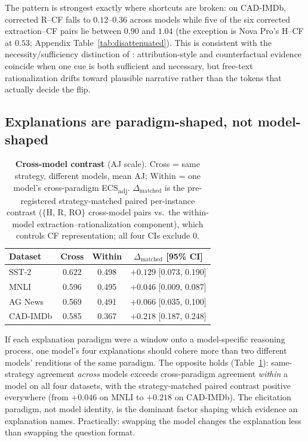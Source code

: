\documentclass[11pt]{article}
\newcommand{\ecsadj}{\mbox{ECS\textsubscript{adj}}}
\begin{document}
The pattern is strongest exactly where shortcuts are broken: on CAD-IMDb, corrected R--CF falls to $0.12$--$0.36$ across models while five of the six corrected extraction--CF pairs lie between $0.90$ and $1.04$ (the exception is Nova Pro's H--CF at $0.53$; Appendix Table~\ref{tab:disattenuated}). This is consistent with the necessity/sufficiency distinction of \citet{mothilal2021towards}: attribution-style and counterfactual evidence coincide when one cue is both sufficient and necessary, but free-text rationalization drifts toward plausible narrative rather than the tokens that actually decide the flip.

\subsection{Explanations are paradigm-shaped, not model-shaped}
\label{sec:crossmodel}

\begin{table}[t]
\centering
\small
\setlength{\tabcolsep}{3.4pt}
\begin{tabular}{lccc}
\toprule
Dataset & Cross & Within & $\Delta_{\text{matched}}$ [95\% CI] \\
\midrule
SST-2    & 0.622 & 0.498 & $+0.129$ [0.073, 0.190] \\
MNLI     & 0.596 & 0.495 & $+0.046$ [0.009, 0.087] \\
AG News  & 0.569 & 0.491 & $+0.066$ [0.035, 0.100] \\
CAD-IMDb & 0.585 & 0.367 & $+0.218$ [0.187, 0.248] \\
\bottomrule
\end{tabular}
\caption{\textbf{Cross-model contrast} (AJ scale). Cross = same strategy, different models, mean AJ; Within = one model's cross-paradigm \ecsadj{}. $\Delta_{\text{matched}}$ is the pre-registered strategy-matched paired per-instance contrast ($\{$H, R, RO$\}$ cross-model pairs vs.\ the within-model extraction--rationalization component), which controls CF representation; all four CIs exclude 0.}
\label{tab:crossmodel}
\end{table}

If each explanation paradigm were a window onto a model-specific reasoning process, one model's four explanations should cohere more than two different models' renditions of the same paradigm. The opposite holds (Table~\ref{tab:crossmodel}): same-strategy agreement \emph{across} models exceeds cross-paradigm agreement \emph{within} a model on all four datasets, with the strategy-matched paired contrast positive everywhere (from $+0.046$ on MNLI to $+0.218$ on CAD-IMDb). The elicitation paradigm, not model identity, is the dominant factor shaping which evidence an explanation names. Practically: swapping the model changes the explanation less than swapping the question format.
\end{document}
